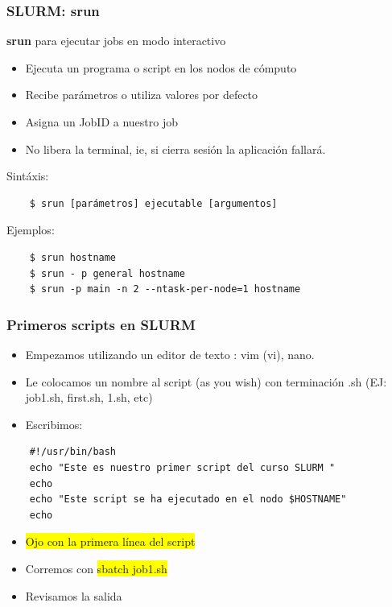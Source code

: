 \documentclass[aspectratio=169,professionalfonts]{beamer}
\newenvironment{minted}[2][]{\VerbatimEnvironment\begin{Verbatim}[#1]}{\end{Verbatim}}
\newcommand{\hl}[1]{\colorbox{yellow}{#1}}
\begin{document}
\begin{frame}[fragile]
\frametitle{\textbf{SLURM: srun}}
\textbf{srun} para ejecutar jobs en modo interactivo 
\begin{itemize}
    \item Ejecuta un programa o script en los nodos de cómputo
    \item Recibe parámetros o utiliza valores por defecto
    \item Asigna un JobID  a nuestro job
    \item No libera la terminal, ie, si cierra sesión la aplicación fallará. 
\end{itemize}
    Sintáxis: 
\begin{verbatim}
    $ srun [parámetros] ejecutable [argumentos]
\end{verbatim}

   
    Ejemplos: 

\begin{verbatim}
    $ srun hostname
    $ srun - p general hostname
    $ srun -p main -n 2 --ntask-per-node=1 hostname
\end{verbatim}
 
\end{frame}


\begin{frame}[fragile]
\frametitle{\textbf{Primeros scripts en SLURM}}
\begin{itemize}
    \item Empezamos utilizando un editor de texto : vim (vi), nano. 
    \item Le colocamos un nombre al script (as you wish) con terminación .sh (EJ: job1.sh, first.sh, 1.sh, etc)
    \item Escribimos:
\end{itemize}

\begin{verbatim}
    #!/usr/bin/bash
    echo "Este es nuestro primer script del curso SLURM "
    echo
    echo "Este script se ha ejecutado en el nodo $HOSTNAME"
    echo 
\end{verbatim}


    \begin{itemize}
        \item \hl{Ojo con la primera línea del script}
        \item Corremos con \hl{sbatch job1.sh}
        \item Revisamos la salida 
    \end{itemize}
    \end{frame}
\end{document}
